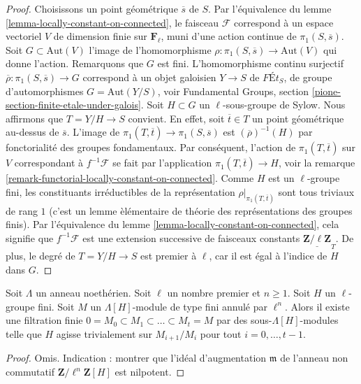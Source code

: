 \begin{proof}
Choisissons un point g\'eom\'etrique $\overline{s}$ de $S$.
Par l'\'equivalence du lemme \ref{lemma-locally-constant-on-connected},
le faisceau $\mathcal{F}$ correspond \`a un espace vectoriel
$V$ de dimension finie sur $\mathbf{F}_\ell$, muni d'une action continue de
$\pi_1(S, \overline{s})$.
Soit $G \subset \text{Aut}(V)$ l'image de l'homomorphisme
$\rho : \pi_1(S, \overline{s}) \to \text{Aut}(V)$ qui donne l'action.
Remarquons que $G$ est fini.
L'homomorphisme continu surjectif
$\overline{\rho} : \pi_1(S, \overline{s}) \to G$
correspond \`a un objet galoisien $Y \to S$ de
$\textit{F\'Et}_S$, de groupe d'automorphismes $G = \text{Aut}(Y/S)$, voir
Fundamental Groups, section \ref{pione-section-finite-etale-under-galois}.
Soit $H \subset G$ un $\ell$-sous-groupe de Sylow.
Nous affirmons que $T = Y/H \to S$ convient. En effet, soit $\overline{t} \in T$
un point g\'eom\'etrique au-dessus de $\overline{s}$. L'image de
$\pi_1(T, \overline{t}) \to \pi_1(S, \overline{s})$
est $(\overline{\rho})^{-1}(H)$ par fonctorialit\'e
des groupes fondamentaux. Par cons\'equent, l'action de $\pi_1(T, \overline{t})$
sur $V$ correspondant \`a $f^{-1}\mathcal{F}$ se fait par
l'application $\pi_1(T, \overline{t}) \to H$, voir la
remarque \ref{remark-functorial-locally-constant-on-connected}. Comme
$H$ est un $\ell$-groupe fini, les constituants irr\'eductibles de la
repr\'esentation $\rho|_{\pi_1(T, \overline{t})}$
sont tous triviaux de rang $1$ (c'est un lemme \`el\'ementaire de
th\'eorie des repr\'esentations des groupes finis).
Par l'\'equivalence du
lemme \ref{lemma-locally-constant-on-connected},
cela signifie que $f^{-1}\mathcal{F}$ est une extension successive de
faisceaux constants $\underline{\mathbf{Z}/\ell\mathbf{Z}}_T$.
De plus, le degr\'e de $T = Y/H \to S$ est premier \`a $\ell$,
car il est \'egal \`a l'indice de $H$ dans $G$.
\end{proof}

\begin{lemma}
\label{lemma-action-l-group}
Soit $\Lambda$ un anneau noeth\'erien.
Soit $\ell$ un nombre premier et $n \geq 1$.
Soit $H$ un $\ell$-groupe fini.
Soit $M$ un $\Lambda[H]$-module de type fini annul\'e par $\ell^n$.
Alors il existe une filtration finie
$0 = M_0 \subset M_1 \subset \ldots \subset M_t = M$
par des sous-$\Lambda[H]$-modules
telle que $H$ agisse trivialement sur $M_{i + 1}/M_i$ pour tout
$i = 0, \ldots, t - 1$.
\end{lemma}

\begin{proof}
Omis. Indication : montrer que l'id\'eal d'augmentation $\mathfrak m$
de l'anneau non commutatif $\mathbf{Z}/\ell^n\mathbf{Z}[H]$
est nilpotent.
\end{proof}

